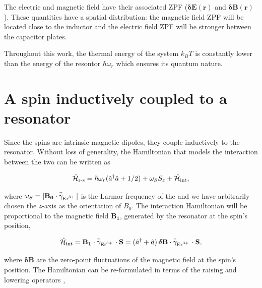 The electric and magnetic field have their associated ZPF ($\boldsymbol{\delta}\mathbf{E}(\mathbf{r})$ and $\boldsymbol{\delta}\mathbf{B}(\mathbf{r})$). These quantities have a spatial distribution: the magnetic field ZPF will be located close to the inductor and the electric field ZPF will be stronger between the capacitor plates.


Throughout this work, the thermal energy of the system $k_B T$ is constantly lower than the energy of the resontor $\hbar \omega_r$ which ensures its quantum nature. 

\section{A spin inductively coupled to a resonator}


Since the \Er spins are intrinsic magnetic dipoles, they couple inductively to the resonator. Without loss of generality, the Hamiltonian that models the interaction between the two can be written as 

\begin{align}
    \hat{\mathcal{H}}_{\text{r-s}} = \hbar\omega_r(\hat{a}^\dagger \hat{a} + 1/2) +  \omega_S S_z + \hat{\mathcal{H}}_{\text{int}},
\end{align}

\noindent where $\omega_S = | \mathbf{B_0} \cdot \bar{\bar{\gamma}}_{\text{Er$^{3+}$\,}} | $ is the Larmor frequency of the \Er and we have arbitrarily chosen the $z$-axis as the orientation of $B_0$. The interaction Hamiltonian will be proportional to the magnetic field $\mathbf{B_1}$, generated by the resonator at the spin's position,

\begin{equation}
    \hat{\mathcal{H}}_{\text{int}} = \mathbf{B_1} \cdot \bar{\bar{\gamma}}_{\text{Er$^{3+}$\,}} \cdot \mathbf{S} = (\hat{a}^\dagger + \hat{a}) \, \boldsymbol{\delta}\mathbf{B} \cdot \bar{\bar{\gamma}}_{\text{Er$^{3+}$\,}} \cdot \mathbf{S},
\end{equation}

\noindent where $\boldsymbol{\delta}\mathbf{B}$ are the zero-point fluctuations of the magnetic field at the \Er spin's position. The Hamiltonian can be re-formulated in terms of the raising and lowering operators ,

